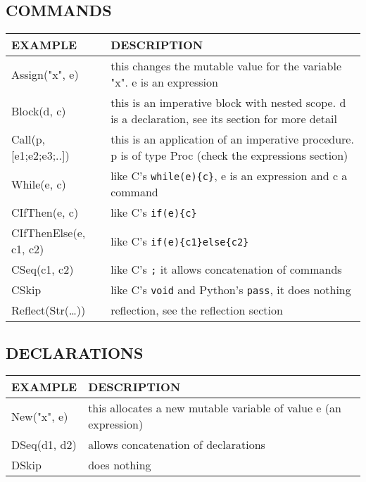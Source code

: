 \documentclass[11pt]{article}
\begin{document}
\subsection{COMMANDS}
\label{sec:orge0ca8b6}
\begin{center}
\begin{tabularx}{\textwidth}{lX}
EXAMPLE & DESCRIPTION\\
\hline
Assign("x", e) & this changes the mutable value for the variable "x". e is an expression\\
Block(d, c) & this is an imperative block with nested scope. d is a declaration, see its section for more detail\\
Call(p, [e1;e2;e3;..]) & this is an application of an imperative procedure. p is of type Proc (check the expressions section)\\
While(e, c) & like C's \texttt{while(e)\{c\}}, e is an expression and c a command\\
CIfThen(e, c) & like C's \texttt{if(e)\{c\}}\\
CIfThenElse(e, c1, c2) & like C's \texttt{if(e)\{c1\}else\{c2\}}\\
CSeq(c1, c2) & like C's \texttt{;} it allows concatenation of commands\\
CSkip & like C's \texttt{void} and Python's \texttt{pass}, it does nothing\\
Reflect(Str(\ldots{})) & reflection, see the reflection section\\
\end{tabularx}
\end{center}
\subsection{DECLARATIONS}
\label{sec:org1831296}
\begin{center}
\begin{tabularx}{\textwidth}{lX}
EXAMPLE & DESCRIPTION\\
\hline
New("x", e) & this allocates a new mutable variable of value e (an expression)\\
DSeq(d1, d2) & allows concatenation of declarations\\
DSkip & does nothing\\
\end{tabularx}
\end{center}
\end{document}
